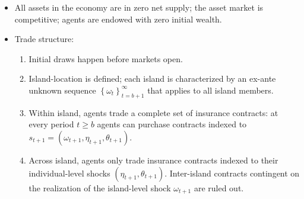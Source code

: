 \documentclass[notes=show]{beamer}
\begin{document}
\bigskip

\begin{frame}%


\begin{itemize}
\item All assets in the economy are in zero net supply; the asset market is
competitive; agents are endowed with zero initial wealth.

\item Trade structure:

\begin{enumerate}
\item Initial draws happen before markets open.

\item Island-location is defined; each island is characterized by an ex-ante
unknown sequence $\left\{ \omega _{t}\right\} _{t=b+1}^{\infty }$ that
applies to all island members.

\item Within island, agents trade a complete set of insurance contracts: at
every period $t\geq b$ agents can purchase contracts indexed to $%
s_{t+1}=\left( \omega _{t+1},\eta _{t+1},\theta _{t+1}\right) $.

\item Across island, agents only trade insurance contracts indexed to their
individual-level shocks $\left( \eta _{t+1},\theta _{t+1}\right) $.
Inter-island contracts contingent on the realization of the island-level
shock $\omega _{t+1}$ are ruled out.
\end{enumerate}
\end{itemize}

\transboxout%
\end{frame}%

\bigskip
\end{document}
